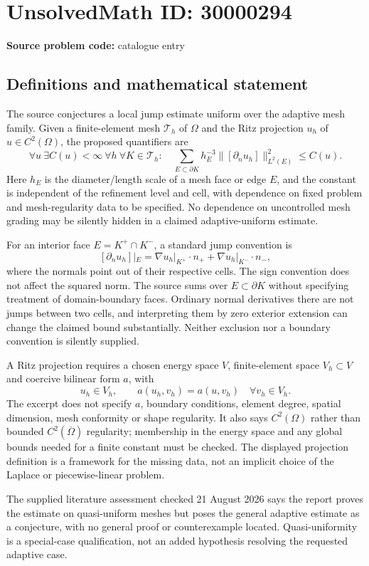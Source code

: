 \documentclass[11pt]{article}
\begin{document}
\section*{UnsolvedMath ID: 30000294}
\textbf{Source problem code:} catalogue entry
\subsection{Definitions and mathematical statement}
The source conjectures a local jump estimate uniform over the adaptive mesh family. Given a finite-element mesh $\mathcal T_h$ of $\Omega$ and the Ritz projection $u_h$ of $u\in C^2(\Omega)$, the proposed quantifiers are
\[
 \forall u\ \exists C(u)<\infty\ \forall h\ \forall K\in\mathcal T_h:\quad
 \sum_{E\subset\partial K}h_E^{-3}
       \|[\partial_n u_h]\|_{L^2(E)}^2\leq C(u).
\]
Here $h_E$ is the diameter/length scale of a mesh face or edge $E$, and the constant is independent of the refinement level and cell, with dependence on fixed problem and mesh-regularity data to be specified. No dependence on uncontrolled mesh grading may be silently hidden in a claimed adaptive-uniform estimate.

For an interior face $E=K^+\cap K^-$, a standard jump convention is
\[
 [\partial_nu_h]|_E=
   \nabla u_h|_{K^+}\cdot n_+
   +\nabla u_h|_{K^-}\cdot n_-,
\]
where the normals point out of their respective cells. The sign convention does not affect the squared norm. The source sums over $E\subset\partial K$ without specifying treatment of domain-boundary faces. Ordinary normal derivatives there are not jumps between two cells, and interpreting them by zero exterior extension can change the claimed bound substantially. Neither exclusion nor a boundary convention is silently supplied.

A Ritz projection requires a chosen energy space $V$, finite-element space $V_h\subset V$ and coercive bilinear form $a$, with
\[
 u_h\in V_h,\qquad a(u_h,v_h)=a(u,v_h)\quad\forall v_h\in V_h.
\]
The excerpt does not specify $a$, boundary conditions, element degree, spatial dimension, mesh conformity or shape regularity. It also says $C^2(\Omega)$ rather than bounded $C^2(\overline\Omega)$ regularity; membership in the energy space and any global bounds needed for a finite constant must be checked. The displayed projection definition is a framework for the missing data, not an implicit choice of the Laplace or piecewise-linear problem.

The supplied literature assessment checked 21 August 2026 says the report proves the estimate on quasi-uniform meshes but poses the general adaptive estimate as a conjecture, with no general proof or counterexample located. Quasi-uniformity is a special-case qualification, not an added hypothesis resolving the requested adaptive case.
\end{document}
